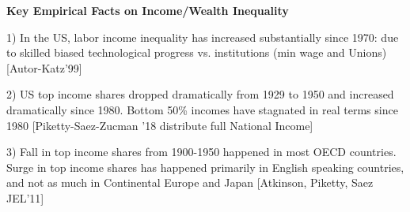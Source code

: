 \documentclass[landscape]{slides}
\begin{document}
\begin{slide}
\begin{center}
{\bf Key Empirical Facts on Income/Wealth Inequality}
\end{center}
1) In the US, labor income inequality has increased substantially
since 1970: due to skilled biased technological progress
vs. institutions (min wage and Unions) [Autor-Katz'99]

2) US top income shares dropped dramatically from 1929 to
1950 and increased dramatically since 1980. Bottom 50\% incomes
have stagnated in real terms since 1980 [Piketty-Saez-Zucman '18 distribute
full National Income]


3) Fall in top income shares from 1900-1950 happened in most
OECD countries. Surge in top income shares has happened primarily
in English speaking countries, and not as much in Continental Europe
and Japan [Atkinson, Piketty, Saez JEL'11]

\end{slide}

\begin{slide}

\end{slide}

\begin{slide}

\end{slide}



\begin{slide}

\end{slide}

%

\begin{slide}

\end{slide}


%
\end{document}
